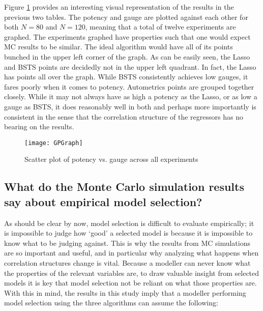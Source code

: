 Figure \ref{fig:GaugePot} provides an interesting visual representation of the results in the previous two tables. The potency and gauge are plotted against each other for both $N=80$ and $N=120$, meaning that a total of twelve experiments are graphed. The experiments graphed have properties such that one would expect MC results to be similar. The ideal algorithm would have all of its points bunched in the upper left corner of the graph. As can be easily seen, the Lasso and BSTS points are decidedly not in the upper left quadrant. In fact, the Lasso has points all over the graph. While BSTS consistently achieves low gauges, it fares poorly when it comes to potency. Autometrics points are grouped together closely. While it may not always have as high a potency as the Lasso, or as low a gauge as BSTS, it does reasonably well in both and perhaps more importantly is consistent in the sense that the correlation structure of the regressors has no bearing on the results. 

\begin{figure}[h]


\centering
\texttt{[image: GPGraph]}
\caption{Scatter plot of potency vs. gauge across all experiments}
\label{fig:GaugePot}


\end{figure}


\subsection{What do the Monte Carlo simulation results say about empirical model selection?}

As should be clear by now, model selection is difficult to evaluate empirically; it is impossible to judge how `good' a selected model is because it is impossible to know what to be judging against. This is why the results from MC simulations are so important and useful, and in particular why analyzing what happens when correlation structures change is vital. Because a modeller can never know what the properties of the relevant variables are, to draw valuable insight from selected models it is key that model selection not be reliant on what those properties are. With this in mind, the results in this study imply that a modeller performing model selection using the three algorithms can assume the following:

